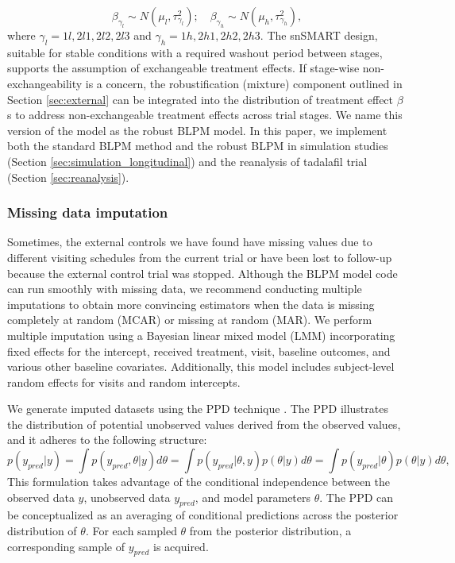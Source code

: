 \begin{equation}
\beta_{\gamma_l} \sim N(\mu_l, \tau_{\gamma_l}^2); \quad \beta_{\gamma_h} \sim N(\mu_h, \tau_{\gamma_h}^2),
\end{equation}
where $\gamma_l = 1l, 2l1, 2l2, 2l3$ and $\gamma_h = 1h, 2h1, 2h2, 2h3$. The \ac{snSMART} design, suitable for stable conditions with a required washout period between stages, supports the assumption of exchangeable treatment effects. If stage-wise non-exchangeability is a concern, the robustification (mixture) component outlined in Section  \ref{sec:external} can be integrated into the distribution of treatment effect $\beta$s to address non-exchangeable treatment effects across trial stages. We name this version of the model as the robust \ac{BLPM} model. In this paper, we implement both the standard \ac{BLPM} method and the robust \ac{BLPM} in simulation studies (Section \ref{sec:simulation_longitudinal}) and the reanalysis of tadalafil trial (Section \ref{sec:reanalysis}).

\subsubsection{Missing data imputation}
\label{sec:missing}
Sometimes, the external controls we have found have missing values due to different visiting schedules from the current trial or have been lost to follow-up because the external control trial was stopped. Although the \ac{BLPM} model code can run smoothly with missing data, we recommend conducting multiple imputations to obtain more convincing estimators when the data is missing completely at random (MCAR) or missing at random (MAR). We perform multiple imputation using a Bayesian linear mixed model (LMM) incorporating fixed effects for the intercept, received treatment, visit, baseline outcomes, and various other baseline covariates. Additionally, this model includes subject-level random effects for visits and random intercepts. 

We generate imputed datasets using the \ac{PPD} technique \citep{gelman2014bayesian}. The \ac{PPD} illustrates the distribution of potential unobserved values derived from the observed values, and it adheres to the following structure:
$$p(y_{pred}|y) = \int{p(y_{pred},\theta|y)d\theta} = \int{p(y_{pred}|\theta,y)p(\theta|y)d\theta} = \int{p(y_{pred}|\theta)p(\theta|y)d\theta},$$
This formulation takes advantage of the conditional independence between the observed data $y$, unobserved data $y_{pred}$, and model parameters $\theta$. The \ac{PPD} can be conceptualized as an averaging of conditional predictions across the posterior distribution of $\theta$. For each sampled $\theta$ from the posterior distribution, a corresponding sample of $y_{pred}$ is acquired.

